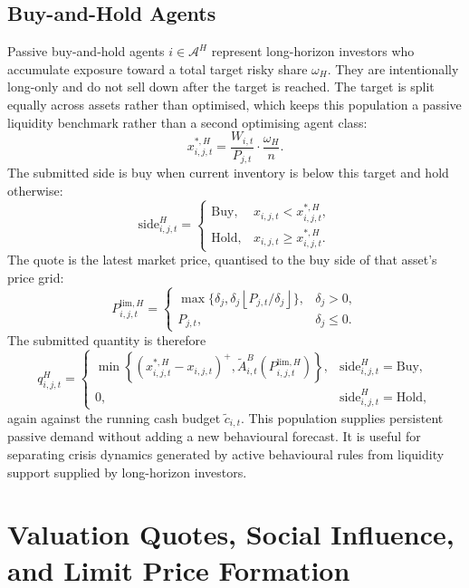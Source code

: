 \documentclass[12pt, a4paper]{article}
\newcommand{\pospart}[1]{\left(#1\right)^{+}}
\begin{document}
    \subsection{Buy-and-Hold Agents}

    Passive buy-and-hold agents \(i\in\mathcal{A}^H\) represent long-horizon
    investors who accumulate exposure toward a total target risky share
    \(\omega_H\). They are intentionally long-only and do not sell down after the
    target is reached. The target is split equally across assets rather than
    optimised, which keeps this population a passive liquidity benchmark rather
    than a second optimising agent class:
    \[
        x_{i,j,t}^{\ast,H}
        =
        \frac{W_{i,t}}{P_{j,t}}\cdot\frac{\omega_H}{n}.
    \]
    The submitted side is buy when current inventory is below this target and
    hold otherwise:
    \[
        \mathrm{side}_{i,j,t}^{H}
        =
        \begin{cases}
            \mathrm{Buy}, & x_{i,j,t}<x_{i,j,t}^{\ast,H},\\
            \mathrm{Hold}, & x_{i,j,t}\ge x_{i,j,t}^{\ast,H}.
        \end{cases}
    \]
    The quote is the latest market price, quantised to the buy side of that
    asset's price grid:
    \[
        P_{i,j,t}^{\text{lim},H}
        =
        \begin{cases}
            \max\{\delta_j,\delta_j\left\lfloor P_{j,t}/\delta_j\right\rfloor\}, & \delta_j>0,\\
            P_{j,t}, & \delta_j\le 0.
        \end{cases}
    \]
    The submitted quantity is therefore
    \[
        q_{i,j,t}^{H}
        =
        \begin{cases}
            \min\left\{\pospart{x_{i,j,t}^{\ast,H}-x_{i,j,t}},
            \tilde A_{i,t}^{B}(P_{i,j,t}^{\text{lim},H})\right\}, & \mathrm{side}_{i,j,t}^{H}=\mathrm{Buy},\\[1.2ex]
            0, & \mathrm{side}_{i,j,t}^{H}=\mathrm{Hold},
        \end{cases}
    \]
    again against the running cash budget \(\tilde c_{i,t}\).
    This population supplies persistent passive demand without adding a new
    behavioural forecast. It is useful for separating crisis dynamics generated by
    active behavioural rules from liquidity support supplied by long-horizon
    investors.

    \section{Valuation Quotes, Social Influence, and Limit Price Formation}\label{sec:valuation_quotes}
\end{document}
